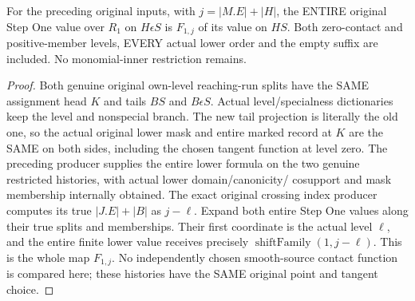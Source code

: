 \begin{theorem}
\label{hir:original-crossing-entire-step-one-curve-value}
\leanok
For the preceding original inputs, with $j=|M.E|+|H|$, the ENTIRE original
Step One value over $R_1$ on $H\epsilon S$ is $F_{1,j}$ of its value on $HS$.
Both zero-contact and positive-member levels, EVERY actual lower order and
the empty suffix are included. No monomial-inner restriction remains.
\end{theorem}
\begin{proof}
Both genuine original own-level reaching-run splits have the SAME assignment
head $K$ and tails $BS$ and $B\epsilon S$. Actual level/specialness dictionaries
keep the level and nonspecial branch. The new tail projection is literally
the old one, so the actual original lower mask and entire marked record at
$K$ are the SAME on both sides, including the chosen tangent function at
level zero. The preceding producer supplies the entire lower formula on
the two genuine restricted histories, with actual lower domain/canonicity/
cosupport and mask membership internally obtained. The exact original crossing
index producer computes its true $|J.E|+|B|$ as $j-\ell$. Expand both entire
Step One values along their true splits and memberships. Their first coordinate
is the actual level $\ell$, and the entire finite lower value receives precisely
$\operatorname{shiftFamily}(1,j-\ell)$. This is the whole map $F_{1,j}$.
No independently chosen smooth-source contact function is compared here;
these histories have the SAME original point and tangent choice.
\end{proof}

